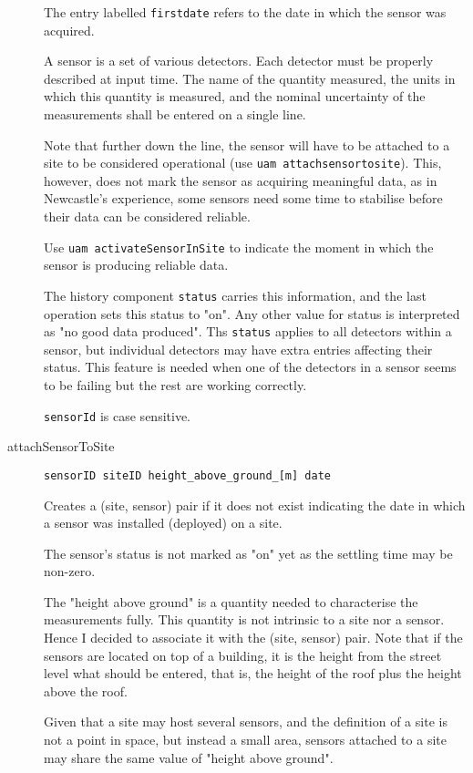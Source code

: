 \documentclass[12pt]{amsart}
\begin{document}
\begin{description}
The entry labelled {\tt firstdate} refers to the date in which the sensor was acquired.

A sensor is a set of various detectors. Each detector must be properly described at input time. The name of the quantity measured, the units in which this quantity is measured, and the nominal uncertainty of the measurements shall be entered on a single line.

Note that further down the line, the sensor will have to be attached to a site to be considered operational (use {\tt uam attachsensortosite}). This, however, does not mark the sensor as acquiring meaningful data, as in Newcastle's experience, some sensors need some time to stabilise before their data can be considered reliable.

Use {\tt uam activateSensorInSite} to indicate the moment in which the sensor is producing reliable data.

The history component {\tt status} carries this information, and the last operation sets this status to "on". Any other value for status is interpreted as "no good data produced". Ths {\tt status} applies to all detectors within a sensor, but individual detectors may have extra entries affecting their status. This feature is needed when one of the detectors in a sensor seems to be failing but the rest are working correctly.

 {\tt sensorId} is case sensitive.

\item[attachSensorToSite] {\tt sensorID siteID height\_above\_ground\_[m] date }

Creates a (site, sensor) pair if it does not exist indicating the date in which a sensor was installed (deployed) on a site.

The sensor's status is not marked as "on" yet as the settling time may be non-zero.

The "height above ground" is a quantity needed to  characterise the measurements fully. 
This quantity is not intrinsic to a site nor a sensor. Hence I decided to associate it with the (site, sensor) pair. Note that if the sensors are located on top of a building, it is the height from the street level what should be entered, that is, the height of the roof plus the height above the roof.

Given that a site may host several sensors, and the definition of a site is not a point in space, but instead a small area, sensors attached to a site may share the same value of "height above ground".


\end{description}
\end{document}
